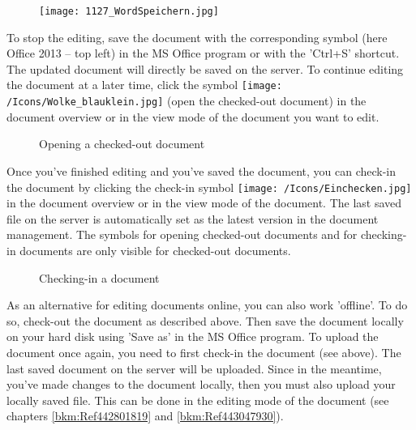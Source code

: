 \begin{figure}
\vspace{-15pt}
\texttt{[image: 1127\_WordSpeichern.jpg]}
\end{figure}
To stop the editing, save the document with the corresponding symbol  (here Office 2013 -- top left) in the MS Office program or with the 'Ctrl+S' shortcut. The updated document will directly be saved on the server. To continue editing the document at a later time, click the symbol \texttt{[image: /Icons/Wolke\_blauklein.jpg]}  (open the checked-out document) in the document overview or in the view mode of the document you want to edit.

\begin{figure}[H]
\caption{Opening a checked-out document}
\end{figure}

Once you've finished editing and you've saved the document, you can check-in the document 
by clicking the check-in symbol \texttt{[image: /Icons/Einchecken.jpg]}  in the document overview or in the view mode of the document. The last saved file on the server is automatically set as the latest version in the document management. The symbols for opening checked-out documents and for checking-in documents are only visible for checked-out documents.

\begin{figure}[H]
\caption{Checking-in a document}
\end{figure}

As an alternative for editing documents online, you can also work 'offline'. To do so, check-out the document as described above. Then save the document locally on your hard disk using 'Save as' in the MS Office program. To upload the document once again, you need to first check-in the document (see above). 
The last saved document on the server will be uploaded. Since in the meantime, you've made changes to the document locally, then you must also upload your locally saved file. This can be done in the editing mode of the document (see chapters \ref{bkm:Ref442801819} and \ref{bkm:Ref443047930}). \newline


